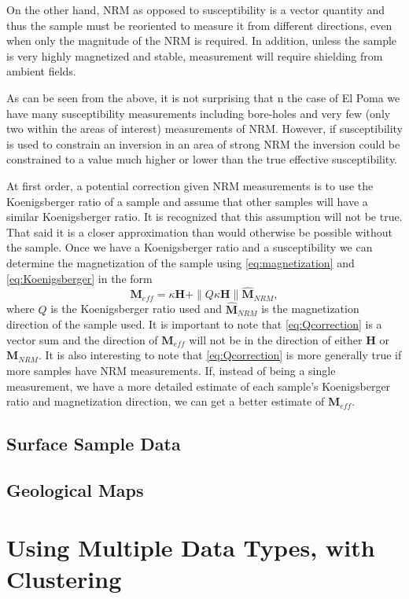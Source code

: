 On the other hand, \ac{NRM} as opposed to susceptibility is a vector quantity and thus the sample must be reoriented to measure it from different directions, even when only the magnitude of the \ac{NRM} is required. In addition, unless the sample is very highly magnetized and stable, measurement will require shielding from ambient fields.

As can be seen from the above, it is not surprising that n the case of El Poma we have many susceptibility measurements including bore-holes and very few (only two within the areas of interest) measurements of \ac{NRM}. However, if susceptibility is used to constrain an inversion in an area of strong \ac{NRM} the inversion could be constrained to a value much higher or lower than the true effective susceptibility. 

At first order, a potential correction given \ac{NRM} measurements is to use the Koenigsberger ratio of a sample and assume that other samples will have a similar Koenigsberger ratio. It is recognized that this assumption will not be true. That said it is a closer approximation than would otherwise be possible without the sample. Once we have a Koenigsberger ratio and a susceptibility we can determine the magnetization of the sample using \autoref{eq:magnetization} and  \autoref{eq:Koenigsberger} in the form
\begin{equation} \label{eq:Qcorrection}
\textbf{M}_{eff} = \kappa\textbf{H} + \|Q\kappa\textbf{H}\|\hat{\mathbf M}_{NRM},
\end{equation}	
where $Q$ is the Koenigsberger ratio used and $\hat{\mathbf M}_{NRM}$ is the magnetization direction of the sample used. It is important to note that \autoref{eq:Qcorrection} is a vector sum and the direction of $\mathbf{M}_{eff}$ will not be in the direction of either $\mathbf H$ or $\mathbf M_{NRM}$. It is also interesting to note that \autoref{eq:Qcorrection} is more generally true if more samples have \ac{NRM} measurements. If, instead of being a single measurement, we have a more detailed estimate of each sample's Koenigsberger ratio and magnetization direction, we can get a better estimate of $\mathbf M_{eff}$.
	
\subsection{Surface Sample Data}
\label{sec: Surface Sample Data}

\subsection{Geological Maps}
\label{sec: Geological Maps}


\section{Using Multiple Data Types, with Clustering}
\label{sec:Using Multiple Data Types, with Clustering}


\endinput

 Interestingly, the assumption that all magnetizations are in the same direction also assumes that all Koenigsberger ratios are equal.

Any text after an \endinput is ignored.
You could put scraps here or things in progress.
